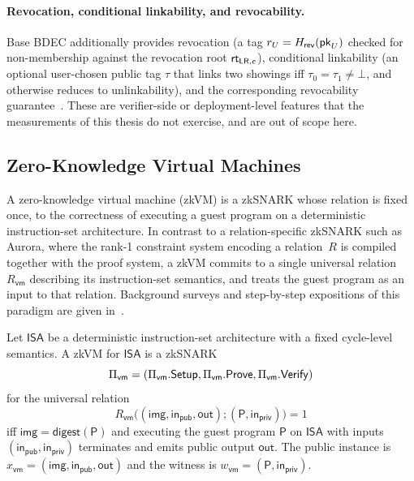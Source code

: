 \begin{construction}
\paragraph{Revocation, conditional linkability, and revocability.}
Base BDEC additionally provides revocation (a tag $r_U=H_{\mathsf{rev}}(\mathsf{pk}_U)$ checked for non-membership against the revocation root $\mathsf{rt}_{\mathsf{LR},e}$), conditional linkability (an optional user-chosen public tag $\tau$ that links two showings iff $\tau_0=\tau_1\neq\bot$, and otherwise reduces to unlinkability), and the corresponding revocability guarantee~\cite{10.1007/978-981-96-0957-4_3}. These are verifier-side or deployment-level features that the measurements of this thesis do not exercise, and are out of scope here.

\end{construction}

\subsection{Zero-Knowledge Virtual Machines}
A zero-knowledge virtual machine (zkVM) is a zkSNARK whose relation is fixed once, to the correctness of executing a guest program on a deterministic instruction-set architecture. In contrast to a relation-specific zkSNARK such as Aurora, where the rank-1 constraint system encoding a relation~$R$ is compiled together with the proof system, a zkVM commits to a single universal relation~$R_{\mathsf{vm}}$ describing its instruction-set semantics, and treats the guest program as an input to that relation. Background surveys and step-by-step expositions of this paradigm are given in~\cite{cryptoeprint:2023/1032,lavin2024surveyapplicationszeroknowledgeproofs}.

\begin{definition}
Let $\mathsf{ISA}$ be a deterministic instruction-set architecture with a fixed cycle-level semantics. A zkVM for $\mathsf{ISA}$ is a zkSNARK
\begin{equation*}
  \Pi_{\mathsf{vm}}=(\Pi_{\mathsf{vm}}.\mathsf{Setup},\Pi_{\mathsf{vm}}.\mathsf{Prove},\Pi_{\mathsf{vm}}.\mathsf{Verify})
\end{equation*}
for the universal relation
\begin{equation*}
  R_{\mathsf{vm}}\bigl((\mathsf{img},\mathsf{in}_{\mathsf{pub}},\mathsf{out});(\mathsf{P},\mathsf{in}_{\mathsf{priv}})\bigr)=1
\end{equation*}
iff $\mathsf{img}=\mathsf{digest}(\mathsf{P})$ and executing the guest program $\mathsf{P}$ on $\mathsf{ISA}$ with inputs $(\mathsf{in}_{\mathsf{pub}},\mathsf{in}_{\mathsf{priv}})$ terminates and emits public output $\mathsf{out}$. The public instance is $x_{\mathsf{vm}}=(\mathsf{img},\mathsf{in}_{\mathsf{pub}},\mathsf{out})$ and the witness is $w_{\mathsf{vm}}=(\mathsf{P},\mathsf{in}_{\mathsf{priv}})$.
\end{definition}

